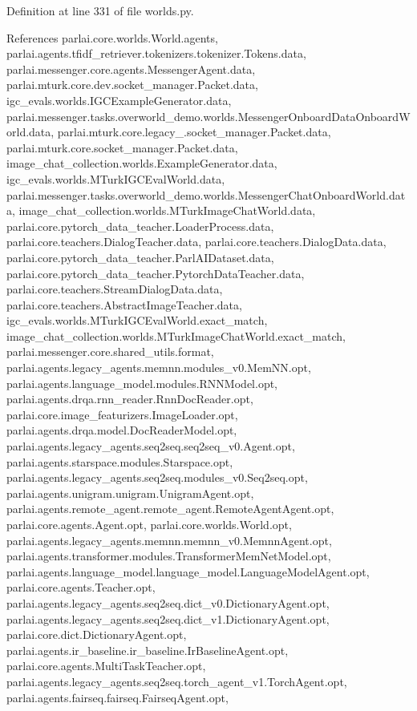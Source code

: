 Definition at line 331 of file worlds.\+py.



References parlai.\+core.\+worlds.\+World.\+agents, parlai.\+agents.\+tfidf\+\_\+retriever.\+tokenizers.\+tokenizer.\+Tokens.\+data, parlai.\+messenger.\+core.\+agents.\+Messenger\+Agent.\+data, parlai.\+mturk.\+core.\+dev.\+socket\+\_\+manager.\+Packet.\+data, igc\+\_\+evals.\+worlds.\+I\+G\+C\+Example\+Generator.\+data, parlai.\+messenger.\+tasks.\+overworld\+\_\+demo.\+worlds.\+Messenger\+Onboard\+Data\+Onboard\+World.\+data, parlai.\+mturk.\+core.\+legacy\+\_.\+socket\+\_\+manager.\+Packet.\+data, parlai.\+mturk.\+core.\+socket\+\_\+manager.\+Packet.\+data, image\+\_\+chat\+\_\+collection.\+worlds.\+Example\+Generator.\+data, igc\+\_\+evals.\+worlds.\+M\+Turk\+I\+G\+C\+Eval\+World.\+data, parlai.\+messenger.\+tasks.\+overworld\+\_\+demo.\+worlds.\+Messenger\+Chat\+Onboard\+World.\+data, image\+\_\+chat\+\_\+collection.\+worlds.\+M\+Turk\+Image\+Chat\+World.\+data, parlai.\+core.\+pytorch\+\_\+data\+\_\+teacher.\+Loader\+Process.\+data, parlai.\+core.\+teachers.\+Dialog\+Teacher.\+data, parlai.\+core.\+teachers.\+Dialog\+Data.\+data, parlai.\+core.\+pytorch\+\_\+data\+\_\+teacher.\+Parl\+A\+I\+Dataset.\+data, parlai.\+core.\+pytorch\+\_\+data\+\_\+teacher.\+Pytorch\+Data\+Teacher.\+data, parlai.\+core.\+teachers.\+Stream\+Dialog\+Data.\+data, parlai.\+core.\+teachers.\+Abstract\+Image\+Teacher.\+data, igc\+\_\+evals.\+worlds.\+M\+Turk\+I\+G\+C\+Eval\+World.\+exact\+\_\+match, image\+\_\+chat\+\_\+collection.\+worlds.\+M\+Turk\+Image\+Chat\+World.\+exact\+\_\+match, parlai.\+messenger.\+core.\+shared\+\_\+utils.\+format, parlai.\+agents.\+legacy\+\_\+agents.\+memnn.\+modules\+\_\+v0.\+Mem\+N\+N.\+opt, parlai.\+agents.\+language\+\_\+model.\+modules.\+R\+N\+N\+Model.\+opt, parlai.\+agents.\+drqa.\+rnn\+\_\+reader.\+Rnn\+Doc\+Reader.\+opt, parlai.\+core.\+image\+\_\+featurizers.\+Image\+Loader.\+opt, parlai.\+agents.\+drqa.\+model.\+Doc\+Reader\+Model.\+opt, parlai.\+agents.\+legacy\+\_\+agents.\+seq2seq.\+seq2seq\+\_\+v0.\+Agent.\+opt, parlai.\+agents.\+starspace.\+modules.\+Starspace.\+opt, parlai.\+agents.\+legacy\+\_\+agents.\+seq2seq.\+modules\+\_\+v0.\+Seq2seq.\+opt, parlai.\+agents.\+unigram.\+unigram.\+Unigram\+Agent.\+opt, parlai.\+agents.\+remote\+\_\+agent.\+remote\+\_\+agent.\+Remote\+Agent\+Agent.\+opt, parlai.\+core.\+agents.\+Agent.\+opt, parlai.\+core.\+worlds.\+World.\+opt, parlai.\+agents.\+legacy\+\_\+agents.\+memnn.\+memnn\+\_\+v0.\+Memnn\+Agent.\+opt, parlai.\+agents.\+transformer.\+modules.\+Transformer\+Mem\+Net\+Model.\+opt, parlai.\+agents.\+language\+\_\+model.\+language\+\_\+model.\+Language\+Model\+Agent.\+opt, parlai.\+core.\+agents.\+Teacher.\+opt, parlai.\+agents.\+legacy\+\_\+agents.\+seq2seq.\+dict\+\_\+v0.\+Dictionary\+Agent.\+opt, parlai.\+agents.\+legacy\+\_\+agents.\+seq2seq.\+dict\+\_\+v1.\+Dictionary\+Agent.\+opt, parlai.\+core.\+dict.\+Dictionary\+Agent.\+opt, parlai.\+agents.\+ir\+\_\+baseline.\+ir\+\_\+baseline.\+Ir\+Baseline\+Agent.\+opt, parlai.\+core.\+agents.\+Multi\+Task\+Teacher.\+opt, parlai.\+agents.\+legacy\+\_\+agents.\+seq2seq.\+torch\+\_\+agent\+\_\+v1.\+Torch\+Agent.\+opt, parlai.\+agents.\+fairseq.\+fairseq.\+Fairseq\+Agent.\+opt, 